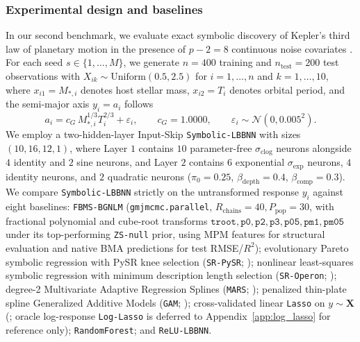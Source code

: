 \documentclass[11pt,a4paper]{article}
\begin{document}
\subsubsection{Experimental design and baselines}
In our second benchmark, we evaluate exact symbolic discovery of Kepler's third law of planetary motion in the presence of $p - 2 = 8$ continuous noise covariates \citep{hubin2021bgnlm}. For each seed $s \in \{1, \dots, M\}$, we generate $n = 400$ training and $n_{\text{test}} = 200$ test observations with $X_{ik} \sim \mathrm{Uniform}(0.5, 2.5)$ for $i = 1, \dots, n$ and $k = 1, \dots, 10$, where $x_{i1} = M_{*,i}$ denotes host stellar mass, $x_{i2} = T_i$ denotes orbital period, and the semi-major axis $y_i = a_i$ follows
\begin{equation}
\label{eq:dgp_kepler}
a_i = c_G\,M_{*,i}^{1/3} T_i^{2/3} + \varepsilon_i, \qquad c_G = 1.0000, \qquad \varepsilon_i \sim \mathcal{N}(0, 0.005^2).
\end{equation}
We employ a two-hidden-layer Input-Skip \texttt{Symbolic-LBBNN} with sizes $(10, 16, 12, 1)$, where Layer $1$ contains $10$ parameter-free $\sigma_{\text{clog}}$ neurons alongside $4$ identity and $2$ sine neurons, and Layer $2$ contains $6$ exponential $\sigma_{\exp}$ neurons, $4$ identity neurons, and $2$ quadratic neurons ($\pi_0 = 0.25$, $\beta_{\text{depth}} = 0.4$, $\beta_{\text{comp}} = 0.3$). We compare \texttt{Symbolic-LBBNN} strictly on the untransformed response $y_i$ against eight baselines: \texttt{FBMS-BGNLM} (\texttt{gmjmcmc.parallel}, $R_{\text{chains}}=40, P_{\text{pop}}=30$, with fractional polynomial and cube-root transforms $\texttt{troot}, \texttt{p0}, \texttt{p2}, \texttt{p3}, \texttt{p05}, \texttt{pm1}, \texttt{pm05}$ under its top-performing \texttt{ZS-null} prior, using MPM features for structural evaluation and native BMA predictions for test RMSE/$R^2$); evolutionary Pareto symbolic regression with PySR knee selection (\texttt{SR-PySR}; \citealp{cranmer2023interpretable}); nonlinear least-squares symbolic regression with minimum description length selection (\texttt{SR-Operon}; \citealp{burlacu2020operon}); degree-2 Multivariate Adaptive Regression Splines (\texttt{MARS}; \citealp{friedman1991multivariate}); penalized thin-plate spline Generalized Additive Models (\texttt{GAM}; \citealp{wood2017generalized}); cross-validated linear \texttt{Lasso} on $y \sim \bm{X}$ (\citealp{friedman2010regularization}; oracle log-response \texttt{Log-Lasso} is deferred to Appendix~\ref{app:log_lasso} for reference only); \texttt{RandomForest}; and \texttt{ReLU-LBBNN}.
\end{document}
